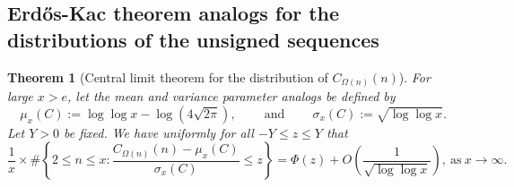 \documentclass[11pt,reqno,a4letter]{article}
\numberwithin{figure}{section}
\numberwithin{table}{section}
\theoremstyle{plain}
\newtheorem{theorem}{Theorem}
\numberwithin{theorem}{section}
\theoremstyle{definition}
\begin{document}
\subsection{Erd\H{o}s-Kac theorem analogs for the distributions of the unsigned sequences} 

\begin{theorem}[Central limit theorem for the distribution of $C_{\Omega(n)}(n)$] 
\label{theorem_CLT_VI} 
For large $x > e$, let the mean and variance parameter analogs be defined by 
\[
     \mu_x(C) := \log\log x - \log\left(4\sqrt{2\pi}\right), 
     \qquad \mathrm{\ and\ } \qquad 
     \sigma_x(C) := \sqrt{\log\log x}. 
\]
Let $Y > 0$ be fixed. 
We have uniformly for all $-Y \leq z \leq Y$ that 
\[
\frac{1}{x} \times \#\left\{2 \leq n \leq x: 
     \frac{C_{\Omega(n)}(n) - \mu_x(C)}{\sigma_x(C)} \leq z\right\} = 
     \Phi\left(z\right) + O\left(\frac{1}{\sqrt{\log\log x}}\right), 
     \mathrm{\ as\ } x \rightarrow \infty. 
\] 
\end{theorem} 
\end{document}
